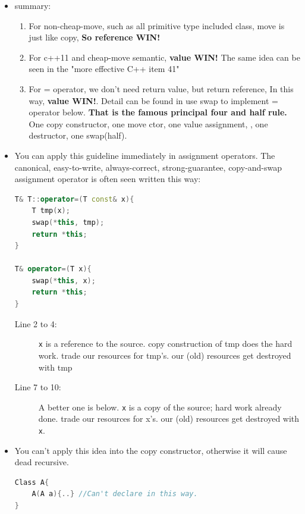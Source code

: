 \documentclass[a4paper,11pt,twoside]{book}
\begin{document}
\begin{itemize}
\begin{enumerate}
\end{enumerate}


\item summary:
\begin{enumerate}
	
	\item For non-cheap-move, such as all primitive type included class, move is just like copy, \textbf{So reference WIN!}
	
	\item For c++11 and cheap-move semantic, \textbf{value WIN!} The same idea can be seen in the "more effective C++ item 41" 
	
	\item For = operator, we don't need return value, but return reference, In this way, \textbf{value WIN!}. Detail can be found in use swap to implement = operator below. \textbf{That is the famous principal four and half rule.} One copy constructor, one move ctor, one value assignment, , one destructor, one swap(half).
	
\end{enumerate}

\item You can apply this guideline immediately in assignment operators. The canonical, easy-to-write, always-correct, strong-guarantee, copy-and-swap assignment operator is often seen written this way:
\begin{lstlisting}[frame=single, language=c++]
T& T::operator=(T const& x){ 
	T tmp(x);          
	swap(*this, tmp);  
	return *this;      
}

T& operator=(T x){ 
	swap(*this, x);
	return *this;   
}
\end{lstlisting}
\begin{description}
	\item[Line 2 to 4:] \texttt{x} is a reference to the source. copy construction of tmp does the hard work. trade our resources for tmp's. our (old) resources get destroyed with tmp 
	
	\item[Line 7 to 10:] A better one is below. \texttt{x} is a copy of the source; hard work already done. trade our resources for x's. our (old) resources get destroyed with \texttt{x}.
\end{description}

\item You can't apply this idea into the copy constructor, otherwise it will cause dead recursive.
\begin{lstlisting}[frame=single, language=c++]
Class A{
	A(A a){..} //Can't declare in this way.
}
\end{lstlisting}


\end{itemize}
\end{document}
